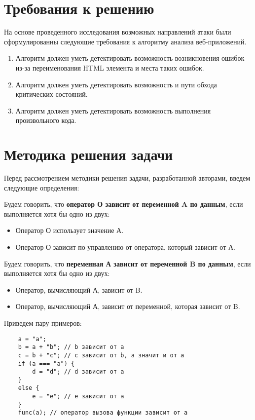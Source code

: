 \section{Требования к решению}
На основе проведенного исследования возможных направлений атаки были сформулированны следующие требования к алгоритму анализа веб-приложений.

\begin{enumerate}
	\item Алгоритм должен уметь детектировать возможность возникновения ошибок из-за переименования HTML элемента и места таких ошибок.
	\item Алгоритм должен уметь детектировать возможность и пути обхода критических состояний.
	\item Алгоритм должен уметь детектировать возможность выполнения произвольного кода.
\end{enumerate}

\section{Методика решения задачи}
Перед рассмотрением методики решения задачи, разработанной авторами, введем следующие определения:


Будем говорить, что \textbf{оператор О зависит от переменной A по данным}, если выполняется хотя бы одно из двух:
\begin{itemize}
	\item Оператор О использует значение А.
	\item Оператор О зависит по управлению от оператора, который зависит от А.
\end{itemize}


Будем говорить, что \textbf{переменная А зависит от переменной B по данным}, если выполняется хотя бы одно из двух:
\begin{itemize}
	\item Оператор, вычисляющий А, зависит от B.
	\item Оператор, вычисляющий А, зависит от переменной, которая зависит от B.
\end{itemize}

\bigskip
Приведем пару примеров:
\begin{lstlisting}
	a = "a";
	b = a + "b"; // b зависит от a
	c = b + "c"; // c зависит от b, а значит и от a
	if (a === "a") { 
		d = "d"; // d зависит от a
	}
	else {
		e = "e"; // e зависит от a
	}
	func(a); // оператор вызова функции зависит от a
\end{lstlisting}
\bigskip


